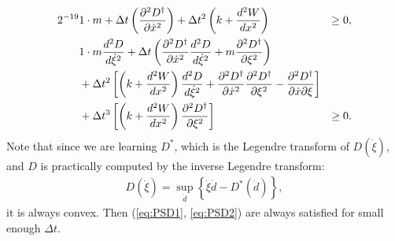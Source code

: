 \begin{align}
    2^{-19}&1 \cdot m + \Delta t \left(\frac{\partial^2 D^\dagger}{\partial \dot{x}^2}\right) + \Delta t^2 \left(k + \frac{d^2 W}{dx^2}\right) &\ge 0, \label{eq:PSD1}\\
    & 1 \cdot m \frac{d^2D}{d\dot{\xi}^2} 
    + \Delta t \left(\frac{\partial^2 D^\dagger}{\partial \dot{x}^2} \frac{d^2D}{d\dot{\xi}^2} + m \frac{\partial^2 D^\dagger}{\partial \xi^2}\right) 
    &\notag \\
    & + \Delta t^2 \left[\left(k + \frac{d^2W}{dx^2}\right)\frac{d^2D}{d\dot{\xi}^2} + \frac{\partial^2 D^\dagger}{\partial \dot{x}^2}\frac{\partial^2 D^\dagger}{\partial \xi^2}-\frac{\partial^2D^\dagger}{\partial \dot{x} \partial \xi}\right] 
    &\notag \\
    & + \Delta t^3 \left[\left(k + \frac{d^2W}{dx^2}\right)\frac{\partial^2D^\dagger}{\partial \xi^2}\right] & \ge 0. \label{eq:PSD2}
\end{align}
Note that since we are learning $D^*$, 
which is the Legendre transform of $D(\dot{\xi})$, 
and $D$ is practically computed by the inverse Legendre transform:
\begin{align}
    D(\dot{\xi}) = \sup_{\dot{d}} \left\{\dot{\xi} \dot{d} - D^*\left(\dot{d}\right)\right\}, 
\end{align}
it is always convex. 
Then (\ref{eq:PSD1}, \ref{eq:PSD2}) are always satisfied for small enough $\Delta t$. 

